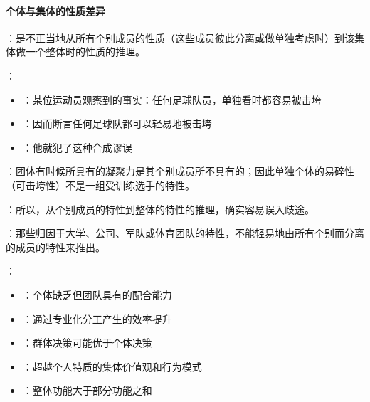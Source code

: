 \paragraph{个体与集体的性质差异}
\begin{examplebox}[title=个体与集体的性质差异]
：是不正当地从所有个别成员的性质（这些成员彼此分离或做单独考虑时）到该集体做一个整体时的性质的推理。

：
\begin{itemize}
  \item {}：某位运动员观察到的事实：任何足球队员，单独看时都容易被击垮
  \item {}：因而断言任何足球队都可以轻易地被击垮
  \item {}：他就犯了这种合成谬误
\end{itemize}

：团体有时候所具有的凝聚力是其个别成员所不具有的；因此单独个体的易碎性（可击垮性）不是一组受训练选手的特性。

：所以，从个别成员的特性到整体的特性的推理，确实容易误入歧途。

：那些归因于大学、公司、军队或体育团队的特性，不能轻易地由所有个别而分离的成员的特性来推出。

：
\begin{itemize}
  \item {}：个体缺乏但团队具有的配合能力
  \item {}：通过专业化分工产生的效率提升
  \item {}：群体决策可能优于个体决策
  \item {}：超越个人特质的集体价值观和行为模式
  \item {}：整体功能大于部分功能之和
\end{itemize}
\end{examplebox}


